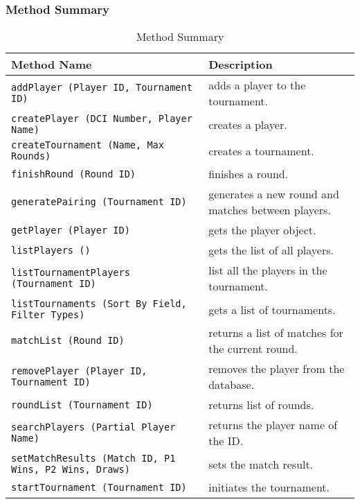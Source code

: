 \documentclass[11pt]{article}
\begin{document}
    \subsubsection{Method Summary}
    \begin{table*}[h]
        \centering
        \begin{tabulary}{0.9\textwidth}{|p{28em}|p{17em}|}
            \hline
            \textbf{Method Name} & \textbf{Description}\\
            \hline
            \texttt{addPlayer (Player ID, Tournament ID)} & adds a player to the tournament.\\
            \hline
            \texttt{createPlayer (DCI Number, Player Name)} & creates a player.\\
            \hline
            \texttt{createTournament (Name, Max Rounds)} & creates a tournament.\\
            \hline
            \texttt{finishRound (Round ID)} & finishes a round.\\
            \hline
            \texttt{generatePairing (Tournament ID)} & generates a new round and matches between players.\\
            \hline
            \texttt{getPlayer (Player ID)} & gets the player object.\\
            \hline
            \texttt{listPlayers ()} & gets the list of all players.\\
            \hline
            \texttt{listTournamentPlayers (Tournament ID)} & list all the players in the tournament.\\
            \hline
            \texttt{listTournaments (Sort By Field, Filter Types)} & gets a list of tournaments.\\
            \hline
            \texttt{matchList (Round ID)} & returns a list of matches for the current round.\\
            \hline
            \texttt{removePlayer (Player ID, Tournament ID)} & removes the player from the database.\\
            \hline
            \texttt{roundList (Tournament ID)} & returns list of rounds.\\
            \hline
            \texttt{searchPlayers (Partial Player Name)} & returns the player name of the ID.\\
            \hline
            \texttt{setMatchResults (Match ID, P1 Wins, P2 Wins, Draws)} & sets the match result.\\
            \hline
            \texttt{startTournament (Tournament ID)} & initiates the tournament.\\
            \hline
        \end{tabulary}
        \caption{Method Summary}
    \end{table*}
    \newpage
\end{document}
